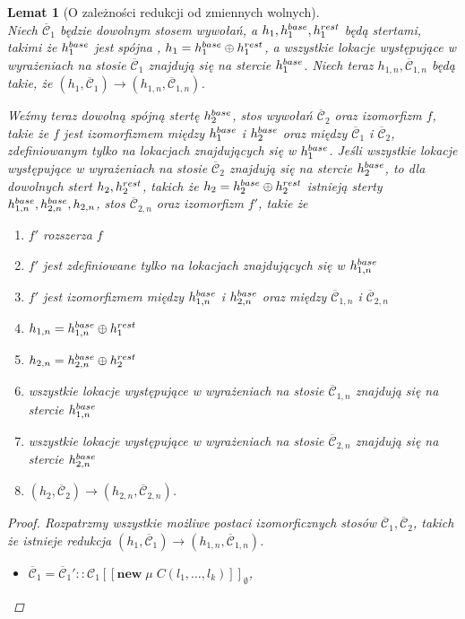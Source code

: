 \documentclass[]{pracamgr}
\renewcommand \| {\hspace{0.75em} | \hspace{0.75em} }
\renewcommand \[ {[\![}
\renewcommand \] {]\!]}
\newtheorem{lemma}{Lemat}
\theoremstyle{definition}
\newcommand{\mmod}{\mu\xspace}
\newcommand{\jnew}{\mathbf{new}\xspace}
\newcommand{\newin}[3]{\jnew\; #1\; #2(#3)\xspace}
\newcommand{\ctxt}{\mathcal{C}\xspace}
\newcommand{\ctxts}{\overline{\ctxt}}
\begin{document}
\begin{lemma}[O zależności redukcji od zmiennych wolnych]{\ } \\
\label{lem:free_red}
Niech $\ctxts_1$ będzie dowolnym stosem wywołań, a $h_1, h^{base}_1, h^{rest}_1$ będą stertami,
takimi że $h^{base}_1$ jest spójna , $h_1 = h^{base}_1 \oplus h^{rest}_1$,
a wszystkie lokacje występujące w wyrażeniach na stosie $\ctxts_1$ znajdują się na stercie $h^{base}_1$.
Niech teraz $h_{1, n}, \ctxts_{1, n}$ będą takie, że $(h_1, \ctxts_1) \rightarrow (h_{1, n}, \ctxts_{1, n})$.

Weźmy teraz dowolną spójną stertę $h^{base}_2$, stos wywołań $\ctxts_2$ oraz izomorfizm $f$,
takie że $f$ jest izomorfizmem między $h^{base}_1$ i $h^{base}_2$ oraz między $\ctxts_1$ i $\ctxts_2$,
zdefiniowanym tylko na lokacjach znajdujących się w $h^{base}_1$.
Jeśli wszystkie lokacje występujące w wyrażeniach na stosie $\ctxts_2$
znajdują się na stercie $h^{base}_2$, to dla dowolnych stert $h_2, h^{rest}_2$, takich że $h_2 = h^{base}_2 \oplus h^{rest}_2$
istnieją sterty $h^{base}_{1, n}, h^{base}_{2, n}, h_{2, n}$, stos $\ctxts_{2, n}$ oraz izomorfizm $f'$, takie że
\begin{enumerate}
 \item $f'$ rozszerza $f$
 \item $f'$ jest zdefiniowane tylko na lokacjach znajdujących się w $h^{base}_{1, n}$
 \item $f'$ jest izomorfizmem między $h^{base}_{1,n}$ i $h^{base}_{2,n}$ oraz między $\ctxts_{1,n}$ i $\ctxts_{2,n}$
 \item $h_{1, n} = h^{base}_{1, n} \oplus h^{rest}_1$
 \item $h_{2, n} = h^{base}_{2, n} \oplus h^{rest}_2$
 \item wszystkie lokacje występujące w wyrażeniach na stosie $\ctxts_{1, n}$ znajdują się na stercie $h^{base}_{1, n}$
 \item wszystkie lokacje występujące w wyrażeniach na stosie $\ctxts_{2, n}$ znajdują się na stercie $h^{base}_{2, n}$
 \item $(h_2, \ctxts_2) \rightarrow (h_{2, n}, \ctxts_{2, n})$.
\end{enumerate}
\begin{proof}
Rozpatrzmy wszystkie możliwe postaci izomorficznych stosów $\ctxts_1, \ctxts_2$, takich że istnieje redukcja 
$(h_1, \ctxts_1) \rightarrow (h_{1, n}, \ctxts_{1, n})$.
\begin{itemize}
 \item $\ctxts_1 = \ctxts_1'::\ctxt_1\[ \newin{\mmod}{C}{l_1,\ldots,l_k} \]_\emptyset$, \;\;

\end{itemize}
\end{proof}
\end{lemma}
\end{document}

